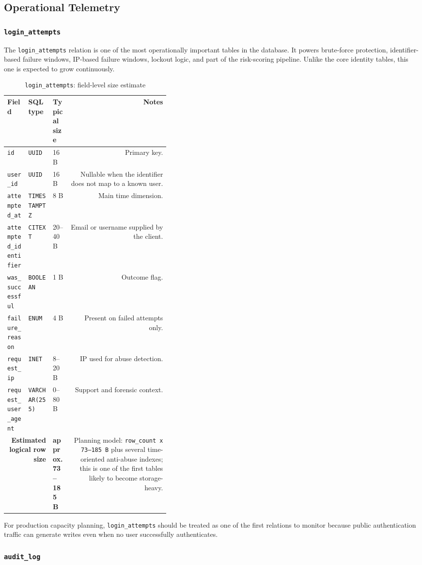 \documentclass[11pt,a4paper]{article}
\newcommand{\dbfield}[4]{\texttt{#1} & \texttt{#2} & #3 & #4 \\}
\newcommand{\dbtotal}[2]{\midrule \multicolumn{2}{r}{\textbf{Estimated logical row size}} & \textbf{#1} & #2 \\}
\begin{document}
\subsection{Operational Telemetry}

\subsubsection{\texttt{login\_attempts}}

The \texttt{login\_attempts} relation is one of the most operationally important tables in the database. It powers brute-force protection, identifier-based failure windows, IP-based failure windows, lockout logic, and part of the risk-scoring pipeline. Unlike the core identity tables, this one is expected to grow continuously.

\begin{table}[H]
\centering
\scriptsize
\caption{\texttt{login\_attempts}: field-level size estimate}
\begin{tabularx}{\linewidth}{T{0.13\linewidth} T{0.15\linewidth} C{0.11\linewidth} N}
\toprule
Field & SQL type & Typical size & Notes \\
\midrule
\dbfield{id}{UUID}{16 B}{Primary key.}
\dbfield{user\_id}{UUID}{16 B}{Nullable when the identifier does not map to a known user.}
\dbfield{attempted\_at}{TIMESTAMPTZ}{8 B}{Main time dimension.}
\dbfield{attempted\_identifier}{CITEXT}{20--40 B}{Email or username supplied by the client.}
\dbfield{was\_successful}{BOOLEAN}{1 B}{Outcome flag.}
\dbfield{failure\_reason}{ENUM}{4 B}{Present on failed attempts only.}
\dbfield{request\_ip}{INET}{8--20 B}{IP used for abuse detection.}
\dbfield{request\_user\_agent}{VARCHAR(255)}{0--80 B}{Support and forensic context.}
\dbtotal{approx. 73--185 B}{Planning model: \texttt{row\_count x 73--185 B} plus several time-oriented anti-abuse indexes; this is one of the first tables likely to become storage-heavy.}
\bottomrule
\end{tabularx}
\end{table}

For production capacity planning, \texttt{login\_attempts} should be treated as one of the first relations to monitor because public authentication traffic can generate writes even when no user successfully authenticates.

\subsubsection{\texttt{audit\_log}}
\end{document}
